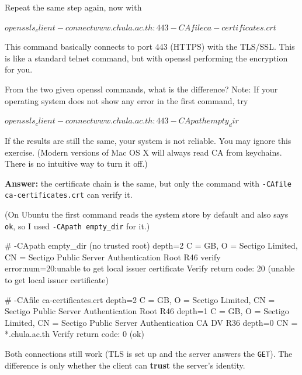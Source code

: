 \documentclass[a4paper, 10pt]{article}
\begin{document}
\noindent Repeat the same step again, now with
\begin{codingbox}[language=bash]
$ openssl s_client -connect www.chula.ac.th:443 -CAfile ca-certificates.crt
$ 
\end{codingbox}

\noindent This command basically connects to port 443 (HTTPS) with the TLS/SSL. This is like
a standard telnet command, but with openssl performing the encryption for you.

\newpage

\begin{problem}
From the two given openssl commands, what is the difference?
Note: If your operating system does not show any error in the first command, try
\begin{codingbox}[language=bash]
$ openssl s_client -connect www.chula.ac.th:443 -CApath empty_dir
$
\end{codingbox}
If the results are still the same, your system is not reliable.
You may ignore this exercise.
(Modern versions of Mac OS X will always read CA from keychains. There is no intuitive way to turn it off.)
\end{problem}

\begin{solution}
	\noindent \textbf{Answer:} the certificate chain is the same, but only the command with \texttt{-CAfile ca-certificates.crt} can verify it.

	\myspace

	\noindent (On Ubuntu the first command reads the system store by default and also says \texttt{ok}, so I used \texttt{-CApath empty\_dir} for it.)

	\myspace

\begin{codingbox*}[numbers=none, xleftmargin=0pt, belowskip=6pt, basicstyle=\ttfamily\footnotesize\color{editortext}]
# -CApath empty_dir  (no trusted root)
depth=2 C = GB, O = Sectigo Limited, CN = Sectigo Public Server Authentication Root R46
verify error:num=20:unable to get local issuer certificate
Verify return code: 20 (unable to get local issuer certificate)

# -CAfile ca-certificates.crt
depth=2 C = GB, O = Sectigo Limited, CN = Sectigo Public Server Authentication Root R46
depth=1 C = GB, O = Sectigo Limited, CN = Sectigo Public Server Authentication CA DV R36
depth=0 CN = *.chula.ac.th
Verify return code: 0 (ok)
\end{codingbox*}
	Both connections still work (TLS is set up and the server answers the \texttt{GET}).
	The difference is only whether the client can \textbf{trust} the server's identity.
\end{solution}
\end{document}
